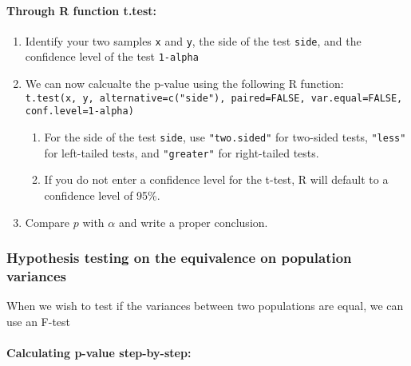 \hypertarget{through-r-function-t.test-1}{%
\paragraph{Through R function
t.test:}\label{through-r-function-t.test-1}}

\begin{enumerate}
\def\labelenumi{\arabic{enumi}.}
\item
  Identify your two samples \texttt{x} and \texttt{y}, the side of the
  test \texttt{side}, and the confidence level of the test
  \texttt{1-alpha}
\item
  We can now calcualte the p-value using the following R function:
  \texttt{t.test(x,\ y,\ alternative=c("side"),\ paired=FALSE,\ var.equal=FALSE,\ conf.level=1-alpha)}

  \begin{enumerate}
  \def\labelenumii{\alph{enumii}.}
  \item
    For the side of the test \texttt{side}, use \texttt{"two.sided"} for
    two-sided tests, \texttt{"less"} for left-tailed tests, and
    \texttt{"greater"} for right-tailed tests.
  \item
    If you do not enter a confidence level for the t-test, R will
    default to a confidence level of 95\%.
  \end{enumerate}
\item
  Compare \(p\) with \(\alpha\) and write a proper conclusion.
\end{enumerate}

\hypertarget{hypothesis-testing-on-the-equivalence-on-population-variances}{%
\subsubsection{Hypothesis testing on the equivalence on population
variances}\label{hypothesis-testing-on-the-equivalence-on-population-variances}}

When we wish to test if the variances between two populations are equal,
we can use an F-test

\hypertarget{calculating-p-value-step-by-step-2}{%
\paragraph{Calculating p-value
step-by-step:}\label{calculating-p-value-step-by-step-2}}

